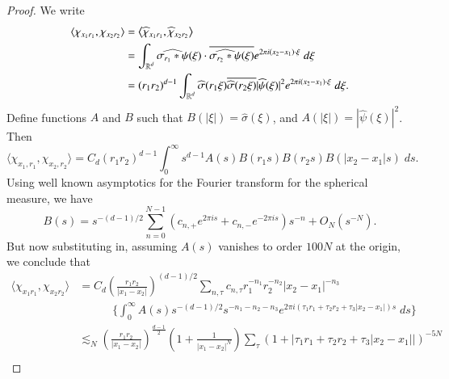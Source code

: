 \begin{proof}
%
    We write
    \begin{align*}
        \langle \chi_{x_1 r_1}, \chi_{x_2 r_2} \rangle &= \left\langle \widehat{\chi}_{x_1 r_1}, \widehat{\chi}_{x_2 r_2} \right\rangle\\
        &= \int_{\operatorname{\mathbb{R}}^d} \widehat{\sigma_{r_1} * \psi}(\xi) \cdot \overline{\widehat{\sigma_{r_2} * \psi}(\xi)} e^{2 \pi i (x_2 - x_1) \cdot \xi}\; d\xi\\
        &= (r_1 r_2)^{d-1} \int_{\operatorname{\mathbb{R}}^d} \widehat{\sigma}(r_1 \xi) \overline{\widehat{\sigma}(r_2 \xi)} |\widehat{\psi}(\xi)|^2 e^{2 \pi i (x_2 - x_1) \cdot \xi}\; d\xi.
    \end{align*}
    Define functions $A$ and $B$ such that $B(|\xi|) = \widehat{\sigma}(\xi)$, and $A(|\xi|) = |\widehat{\psi}(\xi)|^2$. Then
    \[ \langle \chi_{x_1, r_1}, \chi_{x_2, r_2} \rangle = C_d (r_1r_2)^{d-1} \int_0^\infty s^{d-1} A(s) B(r_1 s) B(r_2 s) B(|x_2 - x_1| s)\; ds. \]
    Using well known asymptotics for the Fourier transform for the spherical measure, we have
    \[ B(s) = s^{-(d-1)/2} \sum_{n = 0}^{N-1} (c_{n,+} e^{2 \pi i s} + c_{n,-} e^{-2 \pi i s}) s^{-n} + O_N(s^{-N}). \]
    But now substituting in, assuming $A(s)$ vanishes to order $100N$ at the origin, we conclude that
    \begin{align*}
        \langle \chi_{x_1 r_1}, \chi_{x_2 r_2} \rangle &= C_d \left( \frac{r_1r_2}{|x_1 - x_2|} \right)^{(d-1)/2} \sum_{n,\tau} c_{n,\tau}  r_1^{-n_1} r_2^{-n_2} |x_2 - x_1|^{-n_3}\\
        &\quad\quad\quad \Bigg\{ \int_0^\infty A(s) s^{-(d-1)/2}  s^{-n_1-n_2-n_3} e^{2 \pi i (\tau_1 r_1 + \tau_2 r_2 + \tau_3 |x_2 - x_1|) s}\; ds \Bigg\}\\
        &\lesssim_N \left( \frac{r_1r_2}{|x_1 - x_2|} \right)^{\frac{d-1}{2}} \left(1 + \frac{1}{|x_1 - x_2|^N} \right) \sum_{\tau} \left( 1 + |\tau_1 r_1 + \tau_2 r_2 + \tau_3 |x_2 - x_1|| \right)^{-5N}\\

\end{align*}
\end{proof}
